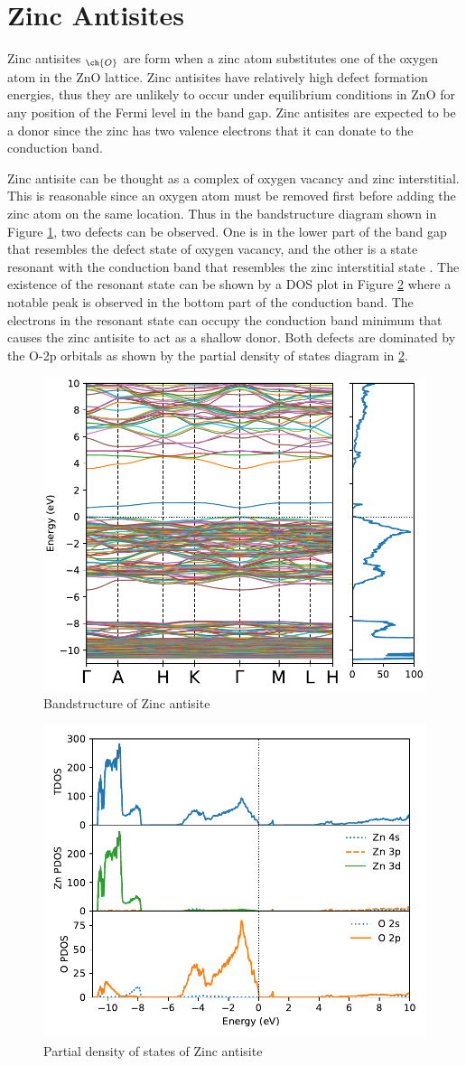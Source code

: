 \section{Zinc Antisites}
Zinc antisites $_{\ch{O}}$ are form when a zinc atom substitutes one of the oxygen atom in the ZnO lattice.
Zinc antisites have relatively high defect formation energies, thus they are unlikely to occur under equilibrium conditions in ZnO for any position of the Fermi level in the band gap. Zinc antisites are expected to be a donor since the  zinc has two valence electrons that it can donate to the conduction band.

Zinc antisite can be thought as a complex of oxygen vacancy and zinc interstitial. This is reasonable since an oxygen atom must be removed first before adding the zinc atom on the same location.  Thus in the bandstructure diagram shown in Figure \ref{fig:bands.Zn-anti}, two defects can be observed. One is in the lower part of the band gap that resembles the defect state of oxygen vacancy, and the other is a state resonant with the conduction band that resembles the zinc interstitial state \citep{Janotti2007}. The existence of the resonant state can be shown by a DOS plot in Figure \ref{fig:dos.Zn-anti} where a notable peak is observed in the bottom part of the conduction band. The electrons in the resonant state can occupy the conduction band minimum that causes the zinc antisite to act as a shallow donor. Both defects are dominated by the O-2p orbitals as shown by the partial density of states diagram in \ref{fig:dos.Zn-anti}.

\begin{figure}[tbh!]
	\centering
	\includegraphics[width=0.6\linewidth]{"images/rnd/band-dos_Zn_anti"}
	\caption[Bandstructure of Zinc antisite]{Bandstructure of Zinc antisite}
	\label{fig:bands.Zn-anti}
\end{figure}

\begin{figure}[tbh!]
	\centering
	\includegraphics[width=0.6\linewidth]{"images/rnd/dos-pdos_Zn_anti"}
	\caption[Partial density of states of Zinc antisite]{Partial density of states of Zinc antisite}
	\label{fig:dos.Zn-anti}
\end{figure}


